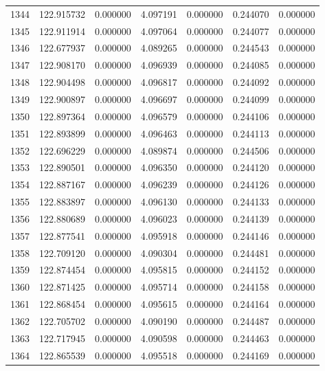 \begin{tabular}{rrrrrrr}
1344 & 122.915732 &    0.000000 &  4.097191 &   0.000000 &   0.244070 &  0.000000 \\
1345 & 122.911914 &    0.000000 &  4.097064 &   0.000000 &   0.244077 &  0.000000 \\
1346 & 122.677937 &    0.000000 &  4.089265 &   0.000000 &   0.244543 &  0.000000 \\
1347 & 122.908170 &    0.000000 &  4.096939 &   0.000000 &   0.244085 &  0.000000 \\
1348 & 122.904498 &    0.000000 &  4.096817 &   0.000000 &   0.244092 &  0.000000 \\
1349 & 122.900897 &    0.000000 &  4.096697 &   0.000000 &   0.244099 &  0.000000 \\
1350 & 122.897364 &    0.000000 &  4.096579 &   0.000000 &   0.244106 &  0.000000 \\
1351 & 122.893899 &    0.000000 &  4.096463 &   0.000000 &   0.244113 &  0.000000 \\
1352 & 122.696229 &    0.000000 &  4.089874 &   0.000000 &   0.244506 &  0.000000 \\
1353 & 122.890501 &    0.000000 &  4.096350 &   0.000000 &   0.244120 &  0.000000 \\
1354 & 122.887167 &    0.000000 &  4.096239 &   0.000000 &   0.244126 &  0.000000 \\
1355 & 122.883897 &    0.000000 &  4.096130 &   0.000000 &   0.244133 &  0.000000 \\
1356 & 122.880689 &    0.000000 &  4.096023 &   0.000000 &   0.244139 &  0.000000 \\
1357 & 122.877541 &    0.000000 &  4.095918 &   0.000000 &   0.244146 &  0.000000 \\
1358 & 122.709120 &    0.000000 &  4.090304 &   0.000000 &   0.244481 &  0.000000 \\
1359 & 122.874454 &    0.000000 &  4.095815 &   0.000000 &   0.244152 &  0.000000 \\
1360 & 122.871425 &    0.000000 &  4.095714 &   0.000000 &   0.244158 &  0.000000 \\
1361 & 122.868454 &    0.000000 &  4.095615 &   0.000000 &   0.244164 &  0.000000 \\
1362 & 122.705702 &    0.000000 &  4.090190 &   0.000000 &   0.244487 &  0.000000 \\
1363 & 122.717945 &    0.000000 &  4.090598 &   0.000000 &   0.244463 &  0.000000 \\
1364 & 122.865539 &    0.000000 &  4.095518 &   0.000000 &   0.244169 &  0.000000 \\

\end{tabular}
